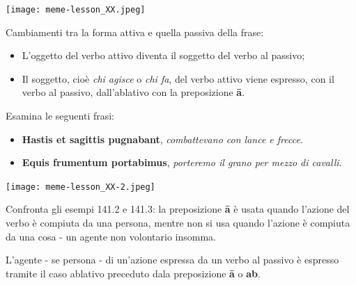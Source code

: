 \documentclass[nols]{tufte-handout}
\newcommand{\textls}[2][5]{%
    \begingroup\addfontfeatures{LetterSpace=#1}#2\endgroup
  }
\renewcommand{\smallcapsspacing}[1]{\textls[10]{#1}}
\renewcommand{\textsc}[1]{\smallcapsspacing{\textsmallcaps{#1}}}
\begin{document}
\begin{marginfigure}
\texttt{[image: meme-lesson\_XX.jpeg]}
\end{marginfigure}

\newpage

 Cambiamenti tra la forma attiva e quella passiva della frase:
\begin{itemize}
\item[\textsc{a.}] L'oggetto del verbo attivo diventa il soggetto del verbo al passivo;  
\item[\textsc{b.}] Il soggetto, cioè  \textit{chi agisce} o  \textit{chi fa}, del verbo attivo viene espresso, con il verbo al passivo, dall'ablativo con la preposizione \textbf{ā}.      
\end{itemize}

 Esamina le seguenti frasi:
\begin{itemize}
\item[\textsc{1.}] \textbf{Hastis et sagittis pugnabant}, \textit{combattevano con lance e frecce}.  
\item[\textsc{2.}] \textbf{Equis frumentum portabimus}, \textit{porteremo il grano per mezzo di cavalli}.  
\end{itemize}

\begin{marginfigure}
\texttt{[image: meme-lesson\_XX-2.jpeg]}
\end{marginfigure}

 Confronta gli esempi 141.2 e 141.3: la preposizione \textbf{ā} è usata quando l'azione del verbo è compiuta da una persona, mentre non si usa quando l'azione è compiuta da una cosa - un agente non volontario insomma.

 L'agente - se persona - di un'azione espressa da un verbo al passivo è espresso tramite il caso ablativo preceduto dala preposizione \textbf{ā} o \textbf{ab}.

\end{document}
